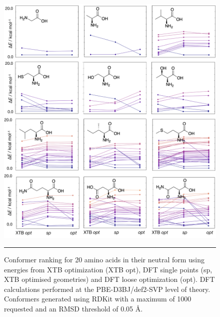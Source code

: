 \documentclass[../../main.tex]{subfiles}
\begin{document}
\begin{figure}[h!]
	\vspace{0.4cm}
	\centering
	\includegraphics[width=\textwidth]{5/autode/figs/figS6a}
	\vspace{0.4cm}
	\hrule
	\caption{Conformer ranking for 20 amino acids in their neutral form using energies from XTB optimization (XTB opt), DFT single points (sp, XTB optimised geometries) and DFT loose optimization (opt). DFT calculations performed at the PBE-D3BJ/def2-SVP level of theory. Conformers generated using RDKit with a maximum of 1000 requested and an RMSD threshold of 0.05 \AA.}
	\label{fig::ade_si_6a}
\end{figure}
\end{document}
